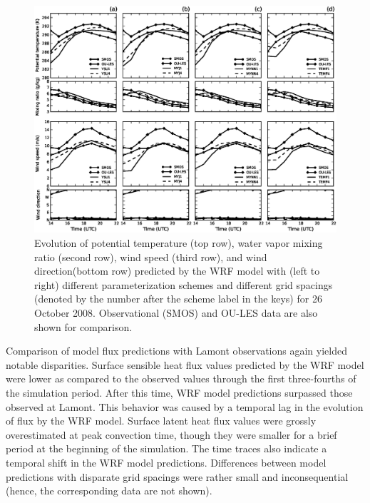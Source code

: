 \begin{figure}[ht!]
\begin{center}
\includegraphics[width=\textwidth]{figures/chapter4/meteogram_grid_20081026}
\end{center}
\caption{Evolution of potential temperature (top row), water vapor mixing ratio (second row), wind speed (third row), and wind direction(bottom row) predicted by the WRF model with (left to right) different parameterization schemes and different grid spacings (denoted by the number after the scheme label in the keys) for 26 October 2008. Observational (SMOS) and OU-LES data are also shown for comparison.}
\label{figure420}
\end{figure}


Comparison of model flux predictions with Lamont observations again yielded notable disparities. Surface sensible heat flux values predicted by the WRF model were lower as compared to the observed values through the first three-fourths of the simulation period. After this time, WRF model predictions surpassed those observed at Lamont. This behavior was caused by a temporal lag in the evolution of flux by the WRF model. Surface latent heat flux values were grossly overestimated at peak convection time, though they were smaller for a brief period at the beginning of the simulation. The time traces also indicate a temporal shift in the WRF model predictions. Differences between model predictions with disparate grid spacings were rather small and inconsequential (hence, the corresponding data are not shown). 

